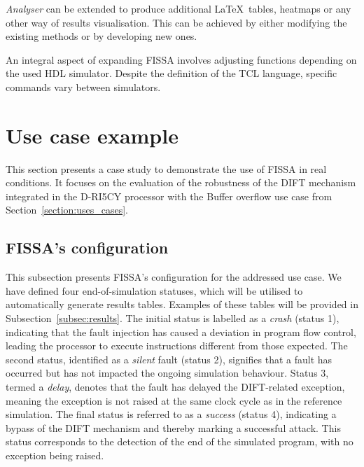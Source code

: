 \textit{Analyser} can be extended to produce additional \LaTeX~tables, heatmaps or any other way of results visualisation. This can be achieved by either modifying the existing methods or by developing new ones.

An integral aspect of expanding FISSA involves adjusting functions depending on the used HDL simulator. Despite the definition of the TCL language, specific commands vary between simulators. %

\section{Use case example}
\label{section:exampleApplication_fissa}
This section presents a case study to demonstrate the use of FISSA in real conditions. It focuses on the evaluation of the robustness of the DIFT mechanism integrated in the D-RI5CY processor with the Buffer overflow use case from Section~\ref{section:uses_cases}.


\subsection{FISSA's configuration}
\label{subsec:tool_config}

This subsection presents FISSA's configuration for the addressed use case. We have defined four end-of-simulation statuses, which will be utilised to automatically generate results tables. Examples of these tables will be provided in Subsection~\ref{subsec:results}.
The initial status is labelled as a \textit{crash} (status 1), indicating that the fault injection has caused a deviation in program flow control, leading the processor to execute instructions different from those expected.
The second status, identified as a \textit{silent} fault (status 2), signifies that a fault has occurred but has not impacted the ongoing simulation behaviour.
Status 3, termed a \textit{delay}, denotes that the fault has delayed the DIFT-related exception, meaning the exception is not raised at the same clock cycle as in the reference simulation.
The final status is referred to as a \textit{success} (status 4), indicating a bypass of the DIFT mechanism and thereby marking a successful attack. This status corresponds to the detection of the end of the simulated program, with no exception being raised.


